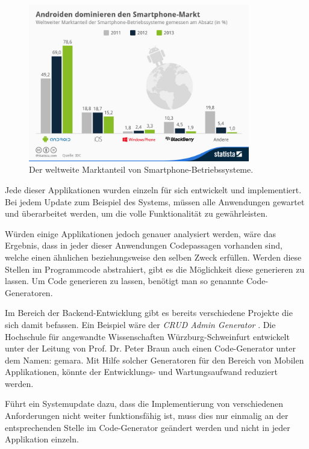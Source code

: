 \begin{figure}[H]
	\begin{center}
		\includegraphics[width=0.86\textwidth]{images/os.jpg}
		\caption{Der weltweite Marktanteil von Smartphone-Betriebssysteme. \cite{os}}
		\label{fig:os_fig}
	\end{center}
\end{figure}

Jede dieser Applikationen wurden einzeln für sich entwickelt und implementiert. Bei jedem Update zum Beispiel des Systems, müssen alle Anwendungen gewartet und überarbeitet werden, um die volle Funktionalität zu gewährleisten.

Würden einige Applikationen jedoch genauer analysiert werden, wäre das Ergebnis, dass in jeder dieser Anwendungen Codepassagen vorhanden sind, welche einen ähnlichen beziehungsweise den selben Zweck erfüllen. Werden diese Stellen im Programmcode abstrahiert, gibt es die Möglichkeit diese generieren zu lassen. Um Code generieren zu lassen, benötigt man so genannte Code-Generatoren. 

Im Bereich der Backend-Entwicklung gibt es bereits verschiedene Projekte die sich damit befassen. Ein Beispiel wäre der \textit{CRUD Admin Generator} \cite{generators}. Die Hochschule für angewandte Wissenschaften Würzburg-Schweinfurt entwickelt  unter der Leitung von Prof. Dr. Peter Braun auch einen Code-Generator unter dem Namen: \ac{gemara}. Mit Hilfe solcher Generatoren für den Bereich von Mobilen Applikationen, könnte der Entwicklungs- und Wartungsaufwand reduziert werden. 

Führt ein Systemupdate dazu, dass die Implementierung von verschiedenen Anforderungen nicht weiter funktionsfähig ist, muss dies nur einmalig an der entsprechenden Stelle im Code-Generator geändert werden und nicht in jeder Applikation einzeln. 

